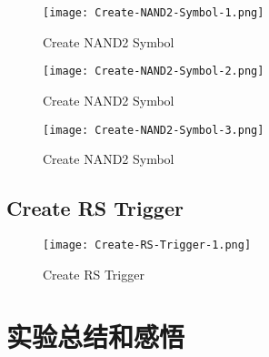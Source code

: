 \documentclass{theme-2614084}
\begin{document}
\begin{figure}[H]
  \centering
  \texttt{[image: Create-NAND2-Symbol-1.png]}
  \caption{Create NAND2 Symbol}
\end{figure}

\begin{figure}[H]
  \centering
  \texttt{[image: Create-NAND2-Symbol-2.png]}
  \caption{Create NAND2 Symbol}
\end{figure}

\begin{figure}[H]
  \centering
  \texttt{[image: Create-NAND2-Symbol-3.png]}
  \caption{Create NAND2 Symbol}
\end{figure}

\subsection{Create RS Trigger}

\begin{figure}[H]
  \centering
  \texttt{[image: Create-RS-Trigger-1.png]}
  \caption{Create RS Trigger}
\end{figure}

\section{实验总结和感悟}
\end{document}
